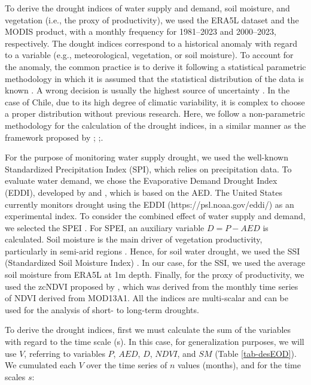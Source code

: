 \documentclass[
  authoryear,
  preprint,
  3p,
  onecolumn]{elsarticle}
\begin{document}
To derive the drought indices of water supply and demand, soil moisture,
and vegetation (i.e., the proxy of productivity), we used the ERA5L
dataset and the MODIS product, with a monthly frequency for 1981--2023
and 2000--2023, respectively. The dought indices correspond to a
historical anomaly with regard to a variable (e.g., meteorological,
vegetation, or soil moisture). To account for the anomaly, the common
practice is to derive it following a statistical parametric methodology
in which it is assumed that the statistical distribution of the data is
known \citep{Heim2002}. A wrong decision is usually the highest source
of uncertainty \citep{Laimighofer2022}. In the case of Chile, due to its
high degree of climatic variability, it is complex to choose a proper
distribution without previous research. Here, we follow a non-parametric
methodology for the calculation of the drought indices, in a similar
manner as the framework proposed by \citet{Farahmand2015};
\citet{Hobbins2016};\citet{McEvoy2016}.

For the purpose of monitoring water supply drought, we used the
well-known Standardized Precipitation Index (SPI), which relies on
precipitation data. To evaluate water demand, we chose the Evaporative
Demand Drought Index (EDDI), developed by \citet{Hobbins2016} and
\citet{McEvoy2016}, which is based on the AED. The United States
currently monitors drought using the EDDI (https://psl.noaa.gov/eddi/)
as an experimental index. To consider the combined effect of water
supply and demand, we selected the SPEI \citep{Vicente-Serrano2010}. For
SPEI, an auxiliary variable \(D = P-AED\) is calculated. Soil moisture
is the main driver of vegetation productivity, particularly in semi-arid
regions \citep{Li2022}. Hence, for soil water drought, we used the SSI
(Standardized Soil Moisture Index) \citep{Hao2013, AghaKouchak2014}. In
our case, for the SSI, we used the average soil moisture from ERA5L at
1m depth. Finally, for the proxy of productivity, we used the zcNDVI
proposed by \citet{Zambrano2018}, which was derived from the monthly
time series of NDVI derived from MOD13A1. All the indices are
multi-scalar and can be used for the analysis of short- to long-term
droughts.

To derive the drought indices, first we must calculate the sum of the
variables with regard to the time scale (s). In this case, for
generalization purposes, we will use \(V\), referring to variables
\(P\), \(AED\), \(D\), \(NDVI\), and \(SM\) (Table \ref{tab-desEOD}). We
cumulated each \(V\) over the time series of \(n\) values (months), and
for the time scales \(s\):
\end{document}
